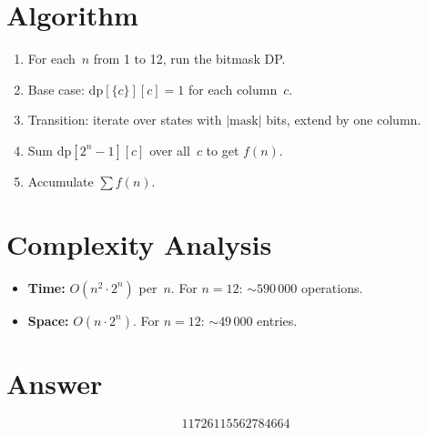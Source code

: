 \documentclass[11pt]{article}
\begin{document}
\section{Algorithm}

\begin{enumerate}
\item For each~$n$ from 1 to 12, run the bitmask DP.
\item Base case: $\mathrm{dp}[\{c\}][c] = 1$ for each column~$c$.
\item Transition: iterate over states with $|\mathrm{mask}|$ bits, extend by one column.
\item Sum $\mathrm{dp}[2^n-1][c]$ over all~$c$ to get $f(n)$.
\item Accumulate $\sum f(n)$.
\end{enumerate}

\section{Complexity Analysis}

\begin{itemize}
\item \textbf{Time:} $O(n^2 \cdot 2^n)$ per~$n$. For $n=12$: $\sim 590\,000$ operations.
\item \textbf{Space:} $O(n \cdot 2^n)$. For $n=12$: $\sim 49\,000$ entries.
\end{itemize}

\section{Answer}

\[
\boxed{11726115562784664}
\]
\end{document}
